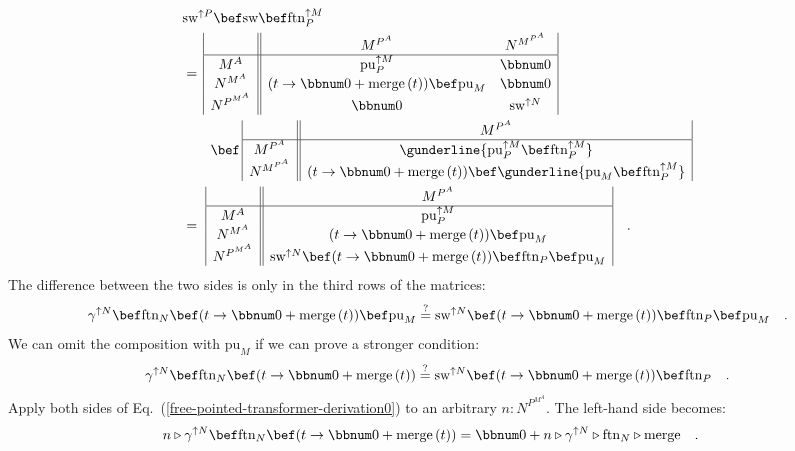 \begin{align*}
 & \text{sw}^{\uparrow P}\bef\text{sw}\bef\text{ftn}_{P}^{\uparrow M}\\
 & =\,\begin{array}{|c||cc|}
 & M^{P^{A}} & N^{M^{P^{A}}}\\
\hline M^{A} & \text{pu}_{P}^{\uparrow M} & \bbnum 0\\
N^{M^{A}} & (t\rightarrow\bbnum 0+\text{merge}\,(t))\bef\text{pu}_{M} & \bbnum 0\\
N^{P^{M^{A}}} & \bbnum 0 & \text{sw}^{\uparrow N}
\end{array}\\
 & \quad\quad\bef\,\begin{array}{|c||c|}
 & M^{P^{A}}\\
\hline M^{P^{A}} & \gunderline{\text{pu}_{P}^{\uparrow M}\bef\text{ftn}_{P}^{\uparrow M}}\\
N^{M^{P^{A}}} & (t\rightarrow\bbnum 0+\text{merge}\,(t))\bef\gunderline{\text{pu}_{M}\bef\text{ftn}_{P}^{\uparrow M}}
\end{array}\\
 & =\,\,\begin{array}{|c||c|}
 & M^{P^{A}}\\
\hline M^{A} & \text{pu}_{P}^{\uparrow M}\\
N^{M^{A}} & (t\rightarrow\bbnum 0+\text{merge}\,(t))\bef\text{pu}_{M}\\
N^{P^{M^{A}}} & \text{sw}^{\uparrow N}\bef(t\rightarrow\bbnum 0+\text{merge}\,(t))\bef\text{ftn}_{P}\bef\text{pu}_{M}
\end{array}\quad.
\end{align*}
The difference between the two sides is only in the third rows of
the matrices:
\[
\gamma^{\uparrow N}\bef\text{ftn}_{N}\bef(t\rightarrow\bbnum 0+\text{merge}\,(t))\bef\text{pu}_{M}\overset{?}{=}\text{sw}^{\uparrow N}\bef(t\rightarrow\bbnum 0+\text{merge}\,(t))\bef\text{ftn}_{P}\bef\text{pu}_{M}\quad.
\]
We can omit the composition with $\text{pu}_{M}$ if we can prove
a stronger condition:
\begin{equation}
\gamma^{\uparrow N}\bef\text{ftn}_{N}\bef(t\rightarrow\bbnum 0+\text{merge}\,(t))\overset{?}{=}\text{sw}^{\uparrow N}\bef(t\rightarrow\bbnum 0+\text{merge}\,(t))\bef\text{ftn}_{P}\quad.\label{free-pointed-transformer-derivation0}
\end{equation}
Apply both sides of Eq.~(\ref{free-pointed-transformer-derivation0})
to an arbitrary $n:N^{P^{M^{A}}}$. The left-hand side becomes:
\begin{align*}
 & n\triangleright\gamma^{\uparrow N}\bef\text{ftn}_{N}\bef(t\rightarrow\bbnum 0+\text{merge}\,(t))=\bbnum 0+n\triangleright\gamma^{\uparrow N}\triangleright\text{ftn}_{N}\triangleright\text{merge}\quad.
\end{align*}
